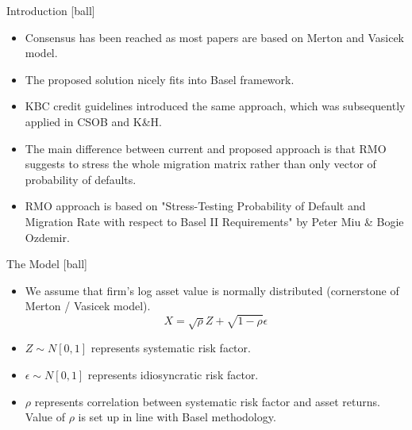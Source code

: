 \documentclass{beamer}
\begin{document}
\begin{frame}{Introduction}
[ball]
\begin{itemize}
	\item Consensus has been reached as most papers are based on Merton and Vasicek model.
	\item The proposed solution nicely fits into Basel framework.
	\item KBC credit guidelines introduced the same approach, which was subsequently applied in CSOB and K\&H.
	\item The main difference between current and proposed approach is that RMO suggests to stress the whole migration matrix rather than only vector of probability of defaults.
	\item RMO approach is based on "Stress-Testing Probability of Default and Migration Rate with respect to Basel II Requirements" by Peter Miu \& Bogie Ozdemir.
\end{itemize}
\end{frame}

\begin{frame}{The Model}
[ball]
\begin{itemize}
	\item We assume that firm's log asset value is normally distributed (cornerstone of Merton / Vasicek model).
		\begin{equation}
			X = \sqrt{\rho} Z  + \sqrt{1 - \rho} \epsilon
		\end{equation}
	\item $Z \sim N[0, 1]$ represents systematic risk factor.
	\item $\epsilon \sim N[0, 1]$ represents idiosyncratic risk factor.
	\item $\rho$ represents correlation between systematic risk factor and asset returns. Value of $\rho$ is set up in line with Basel methodology.
\end{itemize}
\end{frame}
\end{document}
